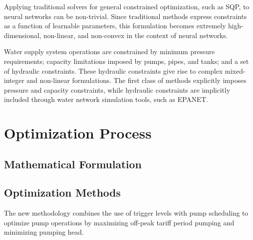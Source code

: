 Applying traditional solvers for general constrained optimization, such as SQP\cite{rfc18}, to neural networks can be non-trivial. Since traditional methods express constraints as a function of learnable parameters, this formulation becomes extremely high-dimensional, non-linear, and non-convex in the context of neural networks.\cite{rfc10}

Water supply system operations are constrained by minimum pressure requirements; capacity limitations imposed by pumps, pipes, and tanks; and a set of hydraulic constraints. These hydraulic constraints give rise to complex mixed-integer and non-linear formulations. The first class of methods explicitly imposes pressure and capacity constraints, while hydraulic constraints are implicitly included through water network simulation tools, such as EPANET.\cite{rfc17}

\section{Optimization Process}

\subsection{Mathematical Formulation}

\subsection{Optimization Methods}

The new methodology combines the use of
trigger levels with pump scheduling to optimize pump operations by maximizing off-peak
tariff period pumping and minimizing pumping head. 

